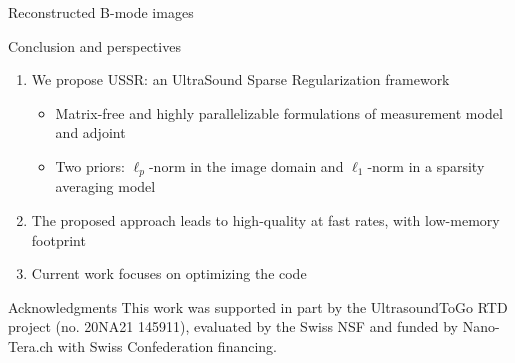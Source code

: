 {\begin{block}{Reconstructed B-mode images}
\end{block}
\vfill

\begin{block}{Conclusion and perspectives}
	\begin{enumerate}
		\item We propose USSR: an UltraSound Sparse Regularization framework
		\begin{itemize}
			\item Matrix-free and highly parallelizable formulations of measurement model and adjoint
			\item Two priors: $\ell_p$-norm in the image domain and $\ell_1$-norm in a sparsity averaging model
		\end{itemize}
		\item The proposed approach leads to high-quality at fast rates, with low-memory footprint
		\item Current work focuses on optimizing the code
	\end{enumerate}
\end{block}
\vfill
\begin{block}{Acknowledgments}
	This work was supported in part by the UltrasoundToGo RTD project (no. 20NA21 145911), evaluated by the Swiss NSF and funded by Nano-Tera.ch with Swiss Confederation financing.
\end{block}
}%